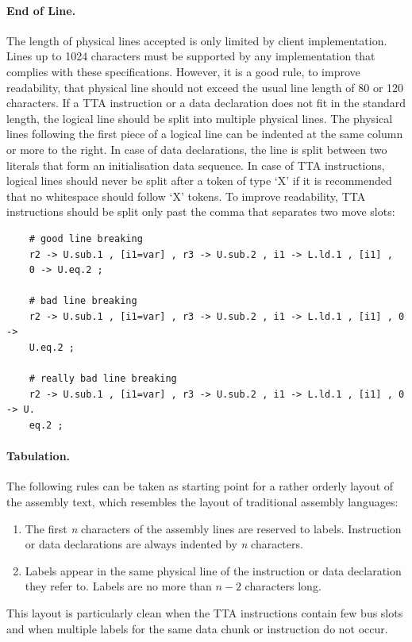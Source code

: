 \documentclass[a4paper,twoside]{tceusermanual}
\begin{document}
\paragraph{End of Line.}
The length of physical lines accepted is only limited by client
implementation.  Lines up to 1024 characters must be supported by any
implementation that complies with these specifications.
%
However, it is a good rule, to improve readability, that physical line
should not exceed the usual line length of 80 or 120 characters. If a TTA
instruction or a data declaration does not fit in the standard length, the
logical line should be split into multiple physical lines. The physical
lines following the first piece of a logical line can be indented at the
same column or more to the right.
%
In case of data declarations, the line is split between two literals that
form an initialisation data sequence.  In case of TTA instructions, logical
lines should never be split after a token of type `X' if it is recommended
that no whitespace should follow `X' tokens.
%
To improve readability, TTA instructions should be split only past the comma
that separates two move slots:
\begin{verbatim}
    # good line breaking
    r2 -> U.sub.1 , [i1=var] , r3 -> U.sub.2 , i1 -> L.ld.1 , [i1] ,
    0 -> U.eq.2 ;

    # bad line breaking
    r2 -> U.sub.1 , [i1=var] , r3 -> U.sub.2 , i1 -> L.ld.1 , [i1] , 0 ->
    U.eq.2 ;

    # really bad line breaking
    r2 -> U.sub.1 , [i1=var] , r3 -> U.sub.2 , i1 -> L.ld.1 , [i1] , 0 -> U.
    eq.2 ;
\end{verbatim}

\paragraph{Tabulation.}
The following rules can be taken as starting point for a rather orderly
layout of the assembly text, which resembles the layout of traditional
assembly languages:
\begin{enumerate}
\item %
  The first \emph{n} characters of the assembly lines are reserved to
  labels.  Instruction or data declarations are always indented by \emph{n}
  characters.
\item %
  Labels appear in the same physical line of the instruction or data
  declaration they refer to. Labels are no more than $n-2$ characters long.
\end{enumerate}
This layout is particularly clean when the TTA instructions contain few bus
slots and when multiple labels for the same data chunk or instruction do not
occur.
\end{document}
